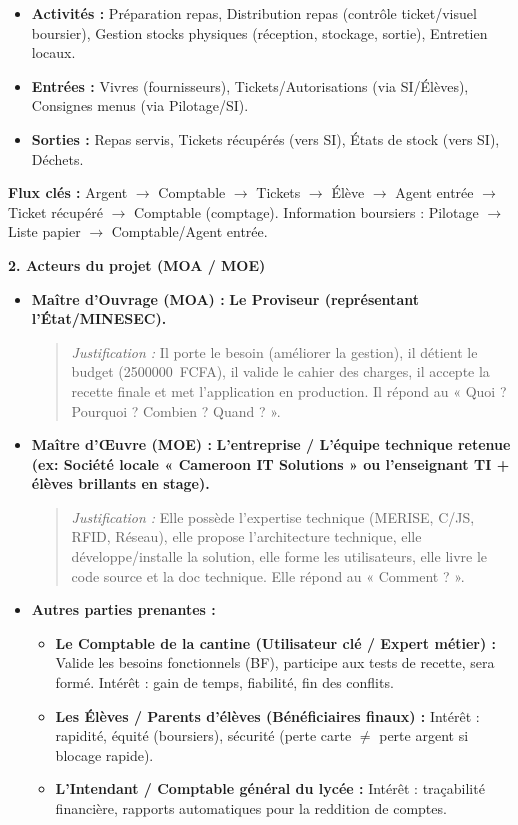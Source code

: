 \documentclass[11pt]{article}
\begin{document}
\begin{exoresolu}
\begin{itemize}
\begin{itemize}
        \item \textbf{Activités :} Préparation repas, Distribution repas (contrôle ticket/visuel boursier), Gestion stocks physiques (réception, stockage, sortie), Entretien locaux.
        \item \textbf{Entrées :} Vivres (fournisseurs), Tickets/Autorisations (via SI/Élèves), Consignes menus (via Pilotage/SI).
        \item \textbf{Sorties :} Repas servis, Tickets récupérés (vers SI), États de stock (vers SI), Déchets.
    \end{itemize}
\end{itemize}
\textbf{Flux clés :} Argent $\rightarrow$ Comptable $\rightarrow$ Tickets $\rightarrow$ Élève $\rightarrow$ Agent entrée $\rightarrow$ Ticket récupéré $\rightarrow$ Comptable (comptage). Information boursiers : Pilotage $\rightarrow$ Liste papier $\rightarrow$ Comptable/Agent entrée.

\medskip
\textbf{2. Acteurs du projet (MOA / MOE)}

\begin{itemize}
    \item \textbf{Maître d'Ouvrage (MOA) :} \textbf{Le Proviseur (représentant l'État/MINESEC).}
    \begin{quote}
    \textit{Justification :} Il porte le besoin (améliorer la gestion), il détient le budget (\SI{2500000}{FCFA}), il valide le cahier des charges, il accepte la recette finale et met l'application en production. Il répond au « Quoi ? Pourquoi ? Combien ? Quand ? ».
    \end{quote}
    \item \textbf{Maître d'Œuvre (MOE) :} \textbf{L'entreprise / L'équipe technique retenue (ex: Société locale « Cameroon IT Solutions » ou l'enseignant TI + élèves brillants en stage).}
    \begin{quote}
    \textit{Justification :} Elle possède l'expertise technique (MERISE, C/JS, RFID, Réseau), elle propose l'architecture technique, elle développe/installe la solution, elle forme les utilisateurs, elle livre le code source et la doc technique. Elle répond au « Comment ? ».
    \end{quote}
    \item \textbf{Autres parties prenantes :}
    \begin{itemize}
        \item \textbf{Le Comptable de la cantine (Utilisateur clé / Expert métier) :} Valide les besoins fonctionnels (BF), participe aux tests de recette, sera formé. Intérêt : gain de temps, fiabilité, fin des conflits.
        \item \textbf{Les Élèves / Parents d'élèves (Bénéficiaires finaux) :} Intérêt : rapidité, équité (boursiers), sécurité (perte carte $\neq$ perte argent si blocage rapide).
        \item \textbf{L'Intendant / Comptable général du lycée :} Intérêt : traçabilité financière, rapports automatiques pour la reddition de comptes.
    \end{itemize}
\end{itemize}


\end{exoresolu}
\end{document}
